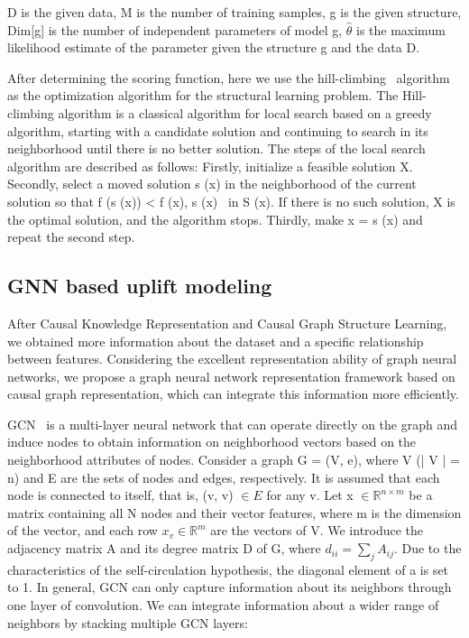 \documentclass[sigconf,screen]{acmart}
\begin{document}
D is the given data, M is the number of training samples, g is the given structure, Dim[g] is the number of independent parameters of model g, $\hat{\theta}$ is the maximum likelihood estimate of the parameter given the structure g and the data D.

After determining the scoring function, here we use the hill-climbing~\citep{hill:Selman} algorithm as the optimization algorithm for the structural learning problem. The Hill-climbing algorithm is a classical algorithm for local search based on a greedy algorithm, starting with a candidate solution and continuing to search in its neighborhood until there is no better solution. The steps of the local search algorithm are described as follows: Firstly, initialize a feasible solution X. Secondly, select a moved solution s (x) in the neighborhood of the current solution so that f (s (x)) < f (x), s (x) \ in S (x). If there is no such solution, X is the optimal solution, and the algorithm stops. Thirdly, make x = s (x) and repeat the second step.


\subsection{GNN based uplift modeling}

After Causal Knowledge Representation and Causal Graph Structure Learning, we obtained more information about the dataset and a specific relationship between features. Considering the excellent representation ability of graph neural networks, we propose a graph neural network representation framework based on causal graph representation, which can integrate this information more efficiently.


GCN~\citep{GCN:Zhang} is a multi-layer neural network that can operate directly on the graph and induce nodes to obtain information on neighborhood vectors based on the neighborhood attributes of nodes. Consider a graph G = (V, e), where V (| V | = n) and E are the sets of nodes and edges, respectively. 
It is assumed that each node is connected to itself, that is, (v, v) $\in E$ for any v. Let x $\in \mathbb{R}^{n \times m}$ be a matrix containing all N nodes and their vector features, where m is the dimension of the vector, and each row $x_{v} \in \mathbb{R}^{m}$ are the vectors of V. We introduce the adjacency matrix A and its degree matrix D of G, where $d_{i i}=\sum_{j} A_{i j}$. Due to the characteristics of the self-circulation hypothesis, the diagonal element of a is set to 1. In general, GCN can only capture information about its neighbors through one layer of convolution. We can integrate information about a wider range of neighbors by stacking multiple GCN layers:
\end{document}
